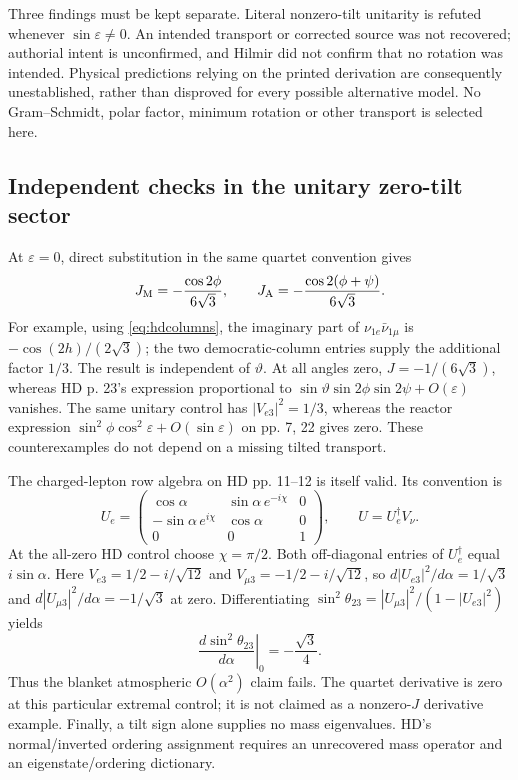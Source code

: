 \documentclass[11pt,a4paper]{article}
\numberwithin{equation}{section}
\begin{document}
Three findings must be kept separate. Literal nonzero-tilt unitarity is refuted whenever $\sin\varepsilon\ne0$. An intended transport or corrected source was not recovered; authorial intent is unconfirmed, and Hilmir did not confirm that no rotation was intended. Physical predictions relying on the printed derivation are consequently unestablished, rather than disproved for every possible alternative model. No Gram--Schmidt, polar factor, minimum rotation or other transport is selected here.

\subsection{Independent checks in the unitary zero-tilt sector}\label{sec:untilted}
At $\varepsilon=0$, direct substitution in the same quartet convention gives
\begin{equation}\label{eq:hdquartet}
 J_{\rm M}=-\frac{\cos2\phi}{6\sqrt3},\qquad
 J_{\rm A}=-\frac{\cos2(\phi+\psi)}{6\sqrt3}.
\end{equation}
For example, using \eqref{eq:hdcolumns}, the imaginary part of $\nu_{1e}\bar\nu_{1\mu}$ is $-\cos(2h)/(2\sqrt3)$; the two democratic-column entries supply the additional factor $1/3$. The result is independent of $\vartheta$. At all angles zero, $J=-1/(6\sqrt3)$, whereas HD p. 23's expression proportional to $\sin\vartheta\sin2\phi\sin2\psi+O(\varepsilon)$ vanishes. The same unitary control has $|V_{e3}|^2=1/3$, whereas the reactor expression $\sin^2\phi\cos^2\varepsilon+O(\sin\varepsilon)$ on pp. 7, 22 gives zero. These counterexamples do not depend on a missing tilted transport.

The charged-lepton row algebra on HD pp. 11--12 is itself valid. Its convention is
\begin{equation}
 U_e=\begin{pmatrix}\cos\alpha&\sin\alpha\,e^{-i\chi}&0\\-\sin\alpha\,e^{i\chi}&\cos\alpha&0\\0&0&1\end{pmatrix},\qquad U=U_e^\dagger V_\nu.
\end{equation}
At the all-zero HD control choose $\chi=\pi/2$. Both off-diagonal entries of $U_e^\dagger$ equal $i\sin\alpha$. Here $V_{e3}=1/2-i/\sqrt{12}$ and $V_{\mu3}=-1/2-i/\sqrt{12}$, so $d|U_{e3}|^2/d\alpha=1/\sqrt3$ and $d|U_{\mu3}|^2/d\alpha=-1/\sqrt3$ at zero. Differentiating $\sin^2\theta_{23}=|U_{\mu3}|^2/(1-|U_{e3}|^2)$ yields
\begin{equation}\label{eq:charged}
 \left.\frac{d\sin^2\theta_{23}}{d\alpha}\right|_0=-\frac{\sqrt3}{4}.
\end{equation}
Thus the blanket atmospheric $O(\alpha^2)$ claim fails. The quartet derivative is zero at this particular extremal control; it is not claimed as a nonzero-$J$ derivative example. Finally, a tilt sign alone supplies no mass eigenvalues. HD's normal/inverted ordering assignment requires an unrecovered mass operator and an eigenstate/ordering dictionary.
\end{document}
